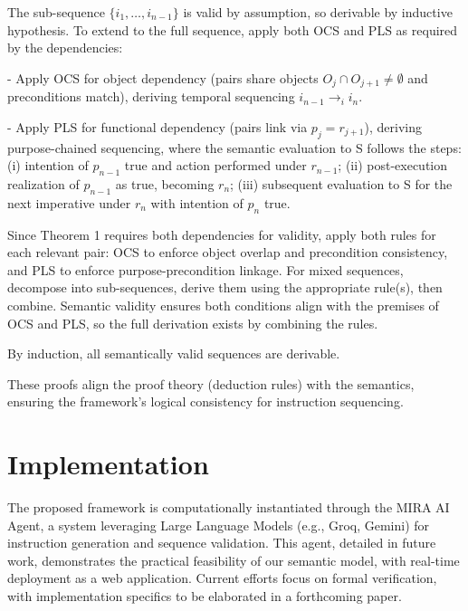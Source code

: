 \documentclass[a4paper,11pt]{lmcs}
\begin{document}
The sub-sequence \( \{i_1, \dots, i_{n-1}\} \) is valid by assumption, so derivable by inductive hypothesis. To extend to the full sequence, apply both OCS and PLS as required by the dependencies:

- Apply OCS for object dependency (pairs share objects \( O_j \cap O_{j+1} \neq \emptyset \) and preconditions match), deriving temporal sequencing \( i_{n-1} \rightarrow_i i_n \).

- Apply PLS for functional dependency (pairs link via \( p_j = r_{j+1} \)), deriving purpose-chained sequencing, where the semantic evaluation to S follows the steps: (i) intention of \( p_{n-1} \) true and action performed under \( r_{n-1} \); (ii) post-execution realization of \( p_{n-1} \) as true, becoming \( r_n \); (iii) subsequent evaluation to S for the next imperative under \( r_n \) with intention of \( p_n \) true.

Since Theorem 1 requires both dependencies for validity, apply both rules for each relevant pair: OCS to enforce object overlap and precondition consistency, and PLS to enforce purpose-precondition linkage. For mixed sequences, decompose into sub-sequences, derive them using the appropriate rule(s), then combine. Semantic validity ensures both conditions align with the premises of OCS and PLS, so the full derivation exists by combining the rules.

By induction, all semantically valid sequences are derivable.

These proofs align the proof theory (deduction rules) with the semantics, ensuring the framework's logical consistency for instruction sequencing.



\section{Implementation}
The proposed framework is computationally instantiated through the MIRA AI Agent, a system leveraging Large Language Models (e.g., Groq, Gemini) for instruction generation and sequence validation. This agent, detailed in future work, demonstrates the practical feasibility of our semantic model, with real-time deployment as a web application. Current efforts focus on formal verification, with implementation specifics to be elaborated in a forthcoming paper.
\end{document}
